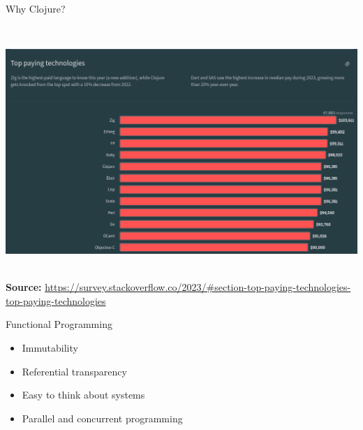 \documentclass[ignorenonframetext,]{beamer}
\providecommand{\tightlist}{%
  \setlength{\itemsep}{0pt}\setlength{\parskip}{0pt}}
\begin{document}
\begin{frame}{Why Clojure?}
\protect\hypertarget{why-clojure-1}{}

\includegraphics[width=\textwidth,height=3.75in]{Stack-Overflow-Developer-Survey-2023-top-paying-technologies.png}
\textbf{Source:}
\url{https://survey.stackoverflow.co/2023/\#section-top-paying-technologies-top-paying-technologies}

\end{frame}

\begin{frame}{Functional Programming}
\protect\hypertarget{functional-programming}{}

\begin{itemize}
\tightlist
\item
  Immutability
\item
  Referential transparency
\item
  Easy to think about systems
\item
  Parallel and concurrent programming
\end{itemize}

\end{frame}
\end{document}
